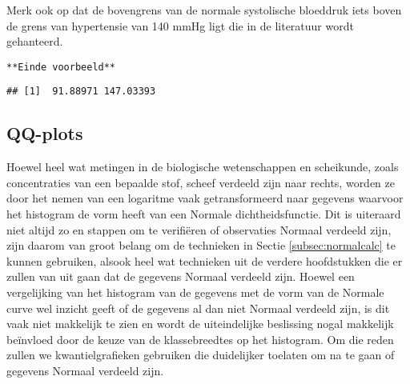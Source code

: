 \documentclass[12pt,dutch,coursenotes]{book}
\newenvironment{Shaded}{\begin{snugshade}}{\end{snugshade}}
\newcommand{\KeywordTok}[1]{\textcolor[rgb]{0.13,0.29,0.53}{\textbf{#1}}}
\newcommand{\FloatTok}[1]{\textcolor[rgb]{0.00,0.00,0.81}{#1}}
\newcommand{\StringTok}[1]{\textcolor[rgb]{0.31,0.60,0.02}{#1}}
\newcommand{\OperatorTok}[1]{\textcolor[rgb]{0.81,0.36,0.00}{\textbf{#1}}}
\newcommand{\NormalTok}[1]{#1}
\theoremstyle{definition}
\theoremstyle{definition}
\theoremstyle{definition}
\theoremstyle{remark}
\begin{document}
Merk ook op dat de bovengrens van de normale systolische bloeddruk iets
boven de grens van hypertensie van 140 mmHg ligt die in de literatuur
wordt gehanteerd.

\texttt{**Einde\ voorbeeld**}

\begin{Shaded}
\end{Shaded}

\begin{verbatim}
## [1]  91.88971 147.03393
\end{verbatim}

\subsection{QQ-plots}\label{sec:qq}

Hoewel heel wat metingen in de biologische wetenschappen en scheikunde,
zoals concentraties van een bepaalde stof, scheef verdeeld zijn naar
rechts, worden ze door het nemen van een logaritme vaak getransformeerd
naar gegevens waarvoor het histogram de vorm heeft van een Normale
dichtheidsfunctie. Dit is uiteraard niet altijd zo en stappen om te
verifiëren of observaties Normaal verdeeld zijn, zijn daarom van groot
belang om de technieken in Sectie \ref{subsec:normalcalc} te kunnen
gebruiken, alsook heel wat technieken uit de verdere hoofdstukken die er
zullen van uit gaan dat de gegevens Normaal verdeeld zijn. Hoewel een
vergelijking van het histogram van de gegevens met de vorm van de
Normale curve wel inzicht geeft of de gegevens al dan niet Normaal
verdeeld zijn, is dit vaak niet makkelijk te zien en wordt de
uiteindelijke beslissing nogal makkelijk beïnvloed door de keuze van de
klassebreedtes op het histogram. Om die reden zullen we
kwantielgrafieken gebruiken die duidelijker toelaten om na te gaan of
gegevens Normaal verdeeld zijn.
\end{document}
